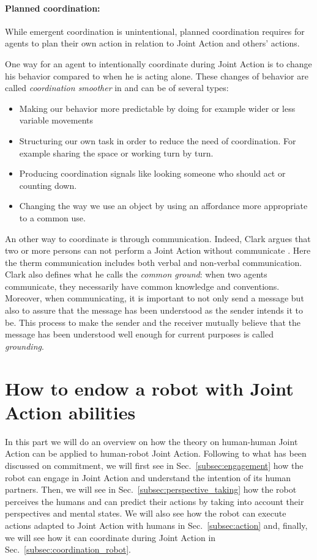 \documentclass[english,a4paper,11pt,twoside]{StyleThese}
\begin{document}
\paragraph{Planned coordination:} 
While emergent coordination is unintentional, planned coordination requires for agents to plan their own action in relation to Joint Action and others' actions.

One way for an agent to intentionally coordinate during Joint Action is to change his behavior compared to when he is acting alone. These changes of behavior are called \textit{coordination smoother} in \cite{vesper2010minimal} and can be of several types:
\begin{itemize}
\item Making our behavior more predictable by doing for example wider or less variable movements
\item Structuring our own task in order to reduce the need of coordination. For example sharing the space or working turn by turn.
\item Producing coordination signals like looking someone who should act or counting down.
\item Changing the way we use an object by using an affordance more appropriate to a common use.
\end{itemize}

An other way to coordinate is through communication. Indeed, Clark argues that two or more persons can not perform a Joint Action without communicate \cite{clark1996using}. Here the therm communication includes both verbal and non-verbal communication. Clark also defines what he calls the \textit{common ground}: when two agents communicate, they necessarily have common knowledge and conventions. Moreover, when communicating, it is important to not only send a message but also to assure that the message has been understood as the sender intends it to be. This process to make the sender and the receiver mutually believe that the message has been understood well enough for current purposes is called \textit{grounding}.


\section{How to endow a robot with Joint Action abilities}

In this part we will do an overview on how the theory on human-human Joint Action can be applied to human-robot Joint Action. Following to what has been discussed on commitment, we will first see in Sec.~\ref{subsec:engagement} how the robot can engage in Joint Action and understand the intention of its human partners. Then, we will see in Sec.~\ref{subsec:perspective_taking} how the robot perceives the humans and can predict their actions by taking into account their perspectives and mental states. We will also see how the robot can execute actions adapted to Joint Action with humans in Sec.~\ref{subsec:action} and, finally, we will see how it can coordinate during Joint Action in Sec.~\ref{subsec:coordination_robot}.
\end{document}
